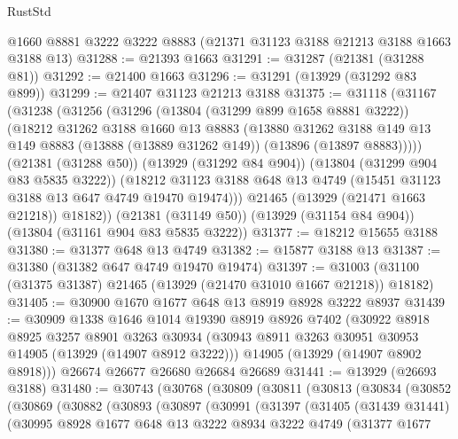 \begin{lexlean}{RustStd}
\begin{coremodule}
    @1660
    @8881
    @3222
    @3222
    @8883
    (@21371 @31123 @3188 @21213 @3188 @1663 @3188 @13)
@31288 := @21393 @1663
@31291 := @31287 (@21381 (@31288 @81))
@31292 := @21400 @1663
@31296 := @31291 (@13929 (@31292 @83 @899))
@31299 := @21407 @31123 @21213 @3188
@31375 := @31118
    (@31167
      (@31238
        (@31256
          (@31296
            (@13804 (@31299 @899 @1658 @8881 @3222))
            (@18212
              @31262
              @3188
              @1660
              @13
              @8883
              (@13880
                @31262
                @3188
                @149
                @13
                @149
                @8883
                (@13888 (@13889 @31262 @149))
                (@13896 (@13897 @8883)))))
          (@21381 (@31288 @50))
          (@13929 (@31292 @84 @904))
          (@13804 (@31299 @904 @83 @5835 @3222))
          (@18212 @31123 @3188 @648 @13 @4749 (@15451 @31123 @3188 @13 @647 @4749 @19470 @19474)))
        @21465
        (@13929 (@21471 @1663 @21218))
        @18182))
    (@21381 (@31149 @50))
    (@13929 (@31154 @84 @904))
    (@13804 (@31161 @904 @83 @5835 @3222))
@31377 := @18212 @15655 @3188
@31380 := @31377 @648 @13 @4749
@31382 := @15877 @3188 @13
@31387 := @31380 (@31382 @647 @4749 @19470 @19474)
@31397 := @31003 (@31100 (@31375 @31387) @21465 (@13929 (@21470 @31010 @1667 @21218)) @18182)
@31405 := @30900 @1670 @1677 @648 @13 @8919 @8928 @3222 @8937
@31439 := @30909
    @1338
    @1646
    @1014
    @19390
    @8919
    @8926
    @7402
    (@30922
      @8918
      @8925
      @3257
      @8901
      @3263
      @30934
      (@30943 @8911 @3263 @30951 @30953 @14905 (@13929 (@14907 @8912 @3222)))
      @14905
      (@13929 (@14907 @8902 @8918)))
    @26674
    @26677
    @26680
    @26684
    @26689
@31441 := @13929 (@26693 @3188)
@31480 := @30743
    (@30768
      (@30809
        (@30811
          (@30813
            (@30834
              (@30852
                (@30869
                  (@30882
                    (@30893
                      (@30897
                        (@30991
                          (@31397
                            (@31405
                              (@31439 @31441)
                              (@30995
                                @8928
                                @1677
                                @648
                                @13
                                @3222
                                @8934
                                @3222
                                @4749
                                (@31377
                                  @1677

\end{coremodule}
\end{lexlean}
